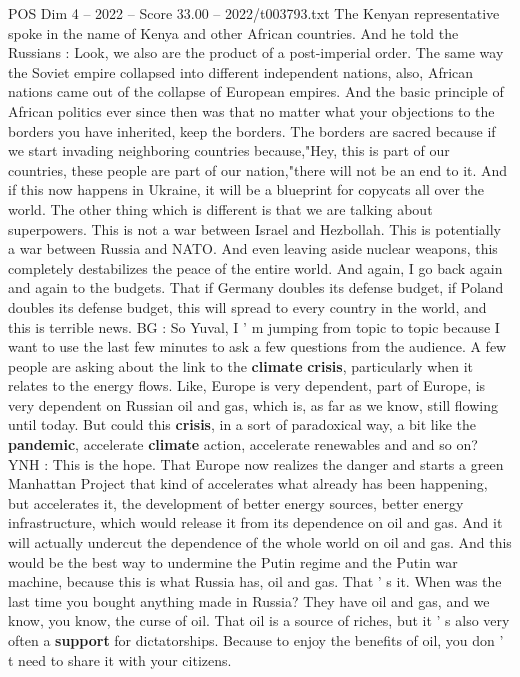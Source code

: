 \begin{textsample}{POS Dim 4 – 2022 – Score 33.00 – 2022/t003793.txt}
The Kenyan representative spoke in the name of Kenya and other African countries.
And he told the Russians : Look, we also are the product of a post-imperial order.
The same way the Soviet empire collapsed into different independent nations, also, African nations came out of the collapse of European empires.
And the basic principle of African politics ever since then was that no matter what your objections to the borders you have inherited, keep the borders.
The borders are sacred because if we start invading neighboring countries because,"Hey, this is part of our countries, these people are part of our nation,"there will not be an end to it.
And if this now happens in Ukraine, it will be a blueprint for copycats all over the world.
The other thing which is different is that we are talking about superpowers.
This is not a war between Israel and Hezbollah.
This is potentially a war between Russia and NATO.
And even leaving aside nuclear weapons, this completely destabilizes the peace of the entire world.
And again, I go back again and again to the budgets.
That if Germany doubles its defense budget, if Poland doubles its defense budget, this will spread to every country in the world, and this is terrible news.
BG : So Yuval, I ' m jumping from topic to topic because I want to use the last few minutes to ask a few questions from the audience.
A few people are asking about the link to the \textbf{climate} \textbf{crisis}, particularly when it relates to the energy flows.
Like, Europe is very dependent, part of Europe, is very dependent on Russian oil and gas, which is, as far as we know, still flowing until today.
But could this \textbf{crisis}, in a sort of paradoxical way, a bit like the \textbf{pandemic}, accelerate \textbf{climate} action, accelerate renewables and and so on?
YNH : This is the hope.
That Europe now realizes the danger and starts a green Manhattan Project that kind of accelerates what already has been happening, but accelerates it, the development of better energy sources, better energy infrastructure, which would release it from its dependence on oil and gas.
And it will actually undercut the dependence of the whole world on oil and gas.
And this would be the best way to undermine the Putin regime and the Putin war machine, because this is what Russia has, oil and gas.
That ' s it.
When was the last time you bought anything made in Russia?
They have oil and gas, and we know, you know, the curse of oil.
That oil is a source of riches, but it ' s also very often a \textbf{support} for dictatorships.
Because to enjoy the benefits of oil, you don ' t need to share it with your citizens.

\end{textsample}
